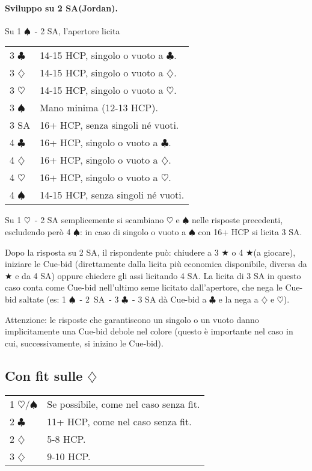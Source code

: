 \documentclass[a4paper,10pt]{article}
\renewcommand{\c}{$\clubsuit$\xspace}
\renewcommand{\d}{$\diamondsuit$\xspace}
\newcommand{\h}{$\heartsuit$\xspace}
\newcommand{\s}{$\spadesuit$\xspace}
\renewcommand{\j}{$\bigstar$\xspace}
\newcommand{\sa}{SA\xspace}
\newcommand{\smallspace}{\vskip0.3cm}
\newenvironment{twocol}
  {\smallspace\noindent\begin{tabular}{l p{0.78\textwidth}}}
  {\end{tabular}\smallspace}
\begin{document}
\paragraph{Sviluppo su 2 \sa (Jordan).} Su 1 \s\ - 2 \sa, l'apertore licita
\begin{twocol}
 3 \c & 14-15 HCP, singolo o vuoto a \c.\\
 3 \d & 14-15 HCP, singolo o vuoto a \d.\\
 3 \h & 14-15 HCP, singolo o vuoto a \h.\\
 3 \s & Mano minima (12-13 HCP).\\
 3 \sa & 16+ HCP, senza singoli né vuoti.\\
 4 \c & 16+ HCP, singolo o vuoto a \c.\\
 4 \d & 16+ HCP, singolo o vuoto a \d.\\
 4 \h & 16+ HCP, singolo o vuoto a \h.\\
 4 \s & 14-15 HCP, senza singoli né vuoti.
\end{twocol}

\noindent Su 1 \h\ - 2 \sa semplicemente si scambiano \h e \s nelle risposte precedenti, escludendo però 4 \s: in caso di singolo o vuoto a \s con 16+ HCP si licita 3 \sa.

Dopo la risposta su 2 \sa, il rispondente può: chiudere a 3 \j o 4 \j (a giocare), iniziare le Cue-bid (direttamente dalla licita più economica disponibile, diversa da \j e da 4 \sa) oppure chiedere gli assi licitando 4 \sa. La licita di 3 \sa in questo caso conta come Cue-bid nell'ultimo seme licitato dall'apertore, che nega le Cue-bid saltate (es: 1 \s\ - \mbox{2 \sa}\ - 3 \c\ - 3 \sa dà Cue-bid a \c e la nega a \d e \h).

Attenzione: le risposte che garantiscono un singolo o un vuoto danno implicitamente una Cue-bid debole nel colore (questo è importante nel caso in cui, successivamente, si inizino le Cue-bid).

\subsection{Con fit sulle \d}

\begin{twocol}
 1 \h/\s & Se possibile, come nel caso senza fit.\\
 2 \c  & 11+ HCP, come nel caso senza fit.\\
 2 \d  & 5-8 HCP.\\
 3 \d  & 9-10 HCP.\\
\end{twocol}
\end{document}
